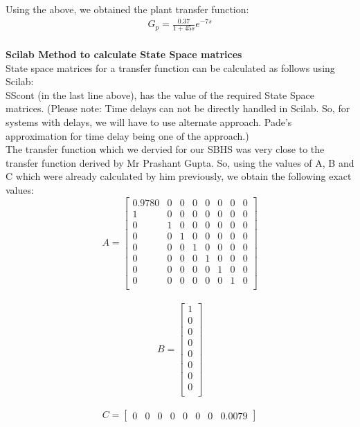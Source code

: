 Using the above, we obtained the plant transfer function: 
\begin{align}
G_{p}=\frac{0.37}{1+45s}e^{-7s} \label{eqn2}
\end{align}
\\
\textbf{Scilab Method to calculate State Space matrices}\\
State space matrices for a transfer function can be calculated as follows using Scilab: \\

SScont (in the last line above), has the value of the required State Space matrices. (Please note: Time delays can not be directly handled in Scilab. So, for systems with delays, we will have to use alternate approach. Pade's approximation for time delay being one of the approach.) \\
The transfer function which we dervied for our SBHS was very close to the transfer function derived by Mr Prashant Gupta. So, using the values of A, B and C which were already calculated by him previously, we obtain the following exact values:
\\
\[
A =
\left[ {\begin{array}{cccccccc}
0.9780 & 0 & 0 & 0 & 0 & 0 & 0 & 0  \\
1 & 0 & 0 & 0 & 0 & 0 & 0 & 0  \\
0 & 1 & 0 & 0 & 0 & 0 & 0 & 0  \\
0 & 0 & 1 & 0 & 0 & 0 & 0 & 0  \\
0 & 0 & 0 & 1 & 0 & 0 & 0 & 0  \\
0 & 0 & 0 & 0 & 1 & 0 & 0 & 0  \\
0 & 0 & 0 & 0 & 0 & 1 & 0 & 0  \\
0 & 0 & 0 & 0 & 0 & 0 & 1 & 0  \\
\end{array} } \right]
\]
\\
\[
B =
\left[ {\begin{array}{c}
 1  \\
0 \\
0  \\
0  \\
0  \\
0  \\
0  \\
0  \\
 \end{array} } \right]
\]
\\
\[
C =
\left[ {\begin{array}{cccccccc}
 0  & 0 & 0 & 0 & 0 & 0 & 0 & 0.0079
 \end{array} } \right]
\]




